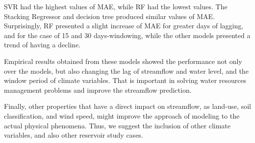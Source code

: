 \documentclass[12pt]{article}
\begin{document}
SVR had the highest values of MAE, while RF had the lowest values. The Stacking Regressor and decision tree produced similar values of MAE. Surprisingly, RF presented a slight increase of MAE for greater days of lagging, and for the case of 15 and 30 days-windowing, while the other models presented a trend of having a decline.

Empirical results obtained from these models showed the performance not only over the models, but also changing the lag of streamflow and water level, and the window period of climate variables. That is important in solving water resources management problems and improve the streamflow prediction.

Finally, other properties that have a direct impact on streamflow, as land-use, soil classification, and wind speed, might improve the approach of modeling to the actual physical phenomena. Thus, we suggest the inclusion of other climate variables, and also other reservoir study cases.










\appendix

\end{document}
